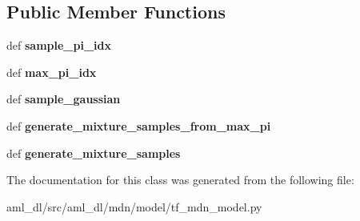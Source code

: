 \subsection*{Public Member Functions}
\begin{DoxyCompactItemize}
\item 
\hypertarget{classsrc_1_1aml__dl_1_1mdn_1_1model_1_1tf__mdn__model_1_1_mixture_of_gaussians_aafa7b73440886fa383f7721192d90241}{def {\bfseries sample\-\_\-pi\-\_\-idx}}\label{classsrc_1_1aml__dl_1_1mdn_1_1model_1_1tf__mdn__model_1_1_mixture_of_gaussians_aafa7b73440886fa383f7721192d90241}

\item 
\hypertarget{classsrc_1_1aml__dl_1_1mdn_1_1model_1_1tf__mdn__model_1_1_mixture_of_gaussians_aa07e6d2b15cc693ad69b4731017dd631}{def {\bfseries max\-\_\-pi\-\_\-idx}}\label{classsrc_1_1aml__dl_1_1mdn_1_1model_1_1tf__mdn__model_1_1_mixture_of_gaussians_aa07e6d2b15cc693ad69b4731017dd631}

\item 
\hypertarget{classsrc_1_1aml__dl_1_1mdn_1_1model_1_1tf__mdn__model_1_1_mixture_of_gaussians_a2b2b4fb1079ae5a088317d6878118ed4}{def {\bfseries sample\-\_\-gaussian}}\label{classsrc_1_1aml__dl_1_1mdn_1_1model_1_1tf__mdn__model_1_1_mixture_of_gaussians_a2b2b4fb1079ae5a088317d6878118ed4}

\item 
\hypertarget{classsrc_1_1aml__dl_1_1mdn_1_1model_1_1tf__mdn__model_1_1_mixture_of_gaussians_a00c000d69685c43b032fd2696e9cffd4}{def {\bfseries generate\-\_\-mixture\-\_\-samples\-\_\-from\-\_\-max\-\_\-pi}}\label{classsrc_1_1aml__dl_1_1mdn_1_1model_1_1tf__mdn__model_1_1_mixture_of_gaussians_a00c000d69685c43b032fd2696e9cffd4}

\item 
\hypertarget{classsrc_1_1aml__dl_1_1mdn_1_1model_1_1tf__mdn__model_1_1_mixture_of_gaussians_a2ad07656f7ddaa8ec0ffb3470403e1c3}{def {\bfseries generate\-\_\-mixture\-\_\-samples}}\label{classsrc_1_1aml__dl_1_1mdn_1_1model_1_1tf__mdn__model_1_1_mixture_of_gaussians_a2ad07656f7ddaa8ec0ffb3470403e1c3}

\end{DoxyCompactItemize}


The documentation for this class was generated from the following file\-:\begin{DoxyCompactItemize}
\item 
aml\-\_\-dl/src/aml\-\_\-dl/mdn/model/tf\-\_\-mdn\-\_\-model.\-py\end{DoxyCompactItemize}
